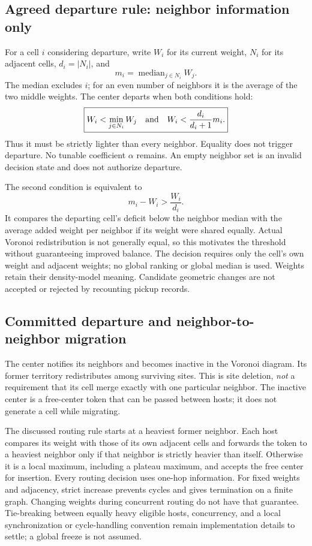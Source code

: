 \documentclass[11pt]{article}
\begin{document}
\subsection{Agreed departure rule: neighbor information only}
For a cell $i$ considering departure, write $W_i$ for its current weight,
$N_i$ for its adjacent cells, $d_i=|N_i|$, and
\[
 m_i=\operatorname{median}_{j\in N_i} W_j.
\]
The median excludes $i$; for an even number of neighbors it is the average
of the two middle weights. The center departs when both conditions hold:
\[
 \boxed{W_i<\min_{j\in N_i}W_j\quad\hbox{and}\quad
 W_i<\frac{d_i}{d_i+1}m_i.}
\]
Thus it must be strictly lighter than every neighbor. Equality does not trigger
departure. No tunable coefficient $\alpha$ remains. An empty neighbor set is
an invalid decision state and does not authorize departure.

The second condition is equivalent to
\[
 m_i-W_i>\frac{W_i}{d_i}.
\]
It compares the departing cell's deficit below the neighbor median with the
average added weight per neighbor if its weight were shared equally. Actual
Voronoi redistribution is not generally equal, so this motivates the threshold
without guaranteeing improved balance. The decision requires only the cell's
own weight and adjacent weights; no global ranking or global median is used.
Weights retain their density-model meaning. Candidate geometric changes are
not accepted or rejected by recounting pickup records.

\subsection{Committed departure and neighbor-to-neighbor migration}
The center notifies its neighbors and becomes inactive in the Voronoi diagram.
Its former territory redistributes among surviving sites. This is site deletion,
\emph{not} a requirement that its cell merge exactly with one particular neighbor.
The inactive center is a free-center token that can be passed between hosts;
it does not generate a cell while migrating.

The discussed routing rule starts at a heaviest former neighbor. Each host
compares its weight with those of its own adjacent cells and forwards the token
to a heaviest neighbor only if that neighbor is strictly heavier than itself.
Otherwise it is a local maximum, including a plateau maximum, and accepts the
free center for insertion. Every routing decision uses one-hop information.
For fixed weights and adjacency, strict increase prevents cycles and gives
termination on a finite graph. Changing weights during concurrent routing do
not have that guarantee. Tie-breaking between equally heavy eligible hosts,
concurrency, and a local synchronization or cycle-handling convention remain
implementation details to settle; a global freeze is not assumed.
\end{document}
